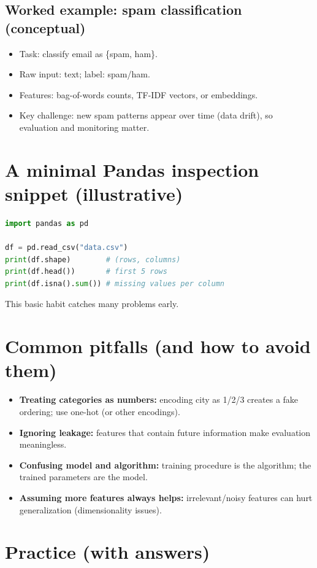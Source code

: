 \documentclass[11pt]{article}
\begin{document}
\subsection{Worked example: spam classification (conceptual)}
\begin{itemize}[leftmargin=*]
  \item Task: classify email as \{spam, ham\}.
  \item Raw input: text; label: spam/ham.
  \item Features: bag-of-words counts, TF-IDF vectors, or embeddings.
  \item Key challenge: new spam patterns appear over time (data drift), so evaluation and monitoring matter.
\end{itemize}

\section{A minimal Pandas inspection snippet (illustrative)}
\begin{lstlisting}[language=Python]
import pandas as pd

df = pd.read_csv("data.csv")
print(df.shape)        # (rows, columns)
print(df.head())       # first 5 rows
print(df.isna().sum()) # missing values per column
\end{lstlisting}
This basic habit catches many problems early.

\section{Common pitfalls (and how to avoid them)}
\begin{itemize}[leftmargin=*]
  \item \textbf{Treating categories as numbers:} encoding city as 1/2/3 creates a fake ordering; use one-hot (or other encodings).
  \item \textbf{Ignoring leakage:} features that contain future information make evaluation meaningless.
  \item \textbf{Confusing model and algorithm:} training procedure is the algorithm; the trained parameters are the model.
  \item \textbf{Assuming more features always helps:} irrelevant/noisy features can hurt generalization (dimensionality issues).
\end{itemize}

\section{Practice (with answers)}
\end{document}
